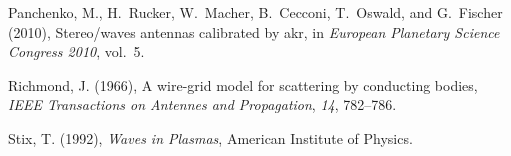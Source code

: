 \documentclass[two-coloumn,ras]{agutex}
\begin{document}
\begin{article}
\begin{thebibliography}{}
Panchenko, M., H.~Rucker, W.~Macher, B.~Cecconi, T.~Oswald, and G.~Fischer
  (2010), Stereo/waves antennas calibrated by akr, in \textit{European
  Planetary Science Congress 2010}, vol.~5.

Richmond, J. (1966), A wire-grid model for scattering by conducting bodies,
  \textit{IEEE Transactions on Antennes and Propagation}, \textit{14},
  782--786.

Stix, T. (1992), \textit{Waves in Plasmas}, American Institute of Physics.



\end{thebibliography}


\end{article}
\end{document}
